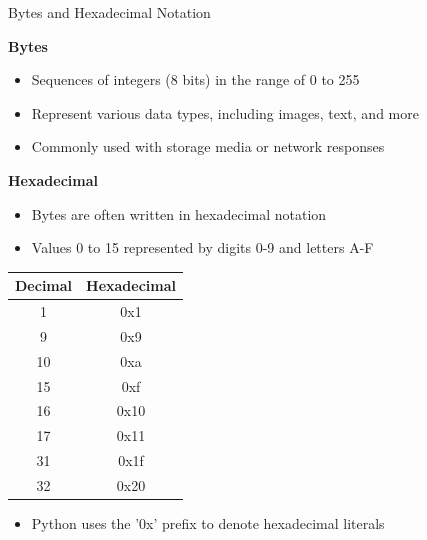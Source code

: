 \documentclass[
	11pt, 
]{beamer}
\begin{document}
\begin{frame}[fragile]{Bytes and Hexadecimal Notation}

\textbf{Bytes}

\begin{itemize}
    \item Sequences of integers (8 bits) in the range of 0 to 255
    \item Represent various data types, including images, text, and more
    \item Commonly used with storage media or network responses
\end{itemize}

\textbf{Hexadecimal}
\begin{itemize}
    \item Bytes are often written in hexadecimal notation
    \item Values 0 to 15 represented by digits 0-9 and letters A-F
\end{itemize}
\begin{table}[]
    \centering
    \tiny
    \begin{tabular}{c|c}
        Decimal & Hexadecimal \\ \hline 
        1 &  0x1\\
        9 & 0x9 \\
        10 & 0xa \\
        15 & 0xf \\
        16 & 0x10 \\
        17 & 0x11 \\
        31 & 0x1f \\
        32 & 0x20 \\
    \end{tabular}
\end{table}
\begin{itemize}
    \item Python uses the '0x' prefix to denote hexadecimal literals
\end{itemize}
\end{frame}

\end{document}
